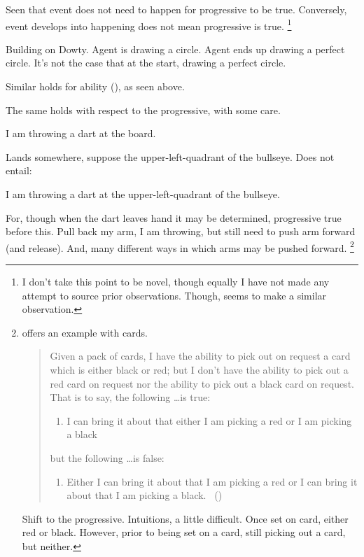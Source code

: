 \begin{note}
  Seen that event does not need to happen for progressive to be true.
  Conversely, event develops into happening does not mean progressive is true.%
  \footnote{
    I don't take this point to be novel, though equally I have not made any attempt to source prior observations.
    Though, \textcite{Lascarides:1991wo} seems to make a similar observation.
  }

  \begin{illustration}
    Building on Dowty.
    Agent is drawing a circle.
    Agent ends up drawing a perfect circle.
    It's not the case that at the start, drawing a perfect circle.
  \end{illustration}

  {
    \color{red}
    Similar holds for ability \citeauthor{Boylan:2020aa} (\citeyear{Boylan:2020aa}), as seen above.
  }

  The same holds with respect to the progressive, with some care.

  I am throwing a dart at the board.

  Lands somewhere, suppose the upper-left-quadrant of the bullseye.
  Does not entail:

  I am throwing a dart at the upper-left-quadrant of the bullseye.

  For, though when the dart leaves hand it may be determined, progressive true before this.
  Pull back my arm, I am throwing, but still need to push arm forward (and release).
  And, many different ways in which arms may be pushed forward.%
  \footnote{
    \citeauthor{Kenny:1976vh} offers an example with cards.

    \begin{quote}
      Given a pack of cards, I have the ability to pick out on request a card which is either black or red; but I don't have the ability to pick out a red card on request nor the ability to pick out a black card on request.
      That is to say, the following \dots is true:

      \begin{enumerate}[label=]
      \item
        I can bring it about that either I am picking a red or I am picking a black
      \end{enumerate}

      but the following \dots is false:

      \begin{enumerate}[label=]
      \item
        Either I can bring it about that I am picking a red or I can bring it about that I am picking a black.%
        \mbox{ }\hfill\mbox{(\citeyear[215]{Kenny:1976vh})}
      \end{enumerate}
    \end{quote}

    Shift to the progressive.
    Intuitions, a little difficult.
    Once set on card, either red or black.
    However, prior to being set on a card, still picking out a card, but neither.
  }
\end{note}

